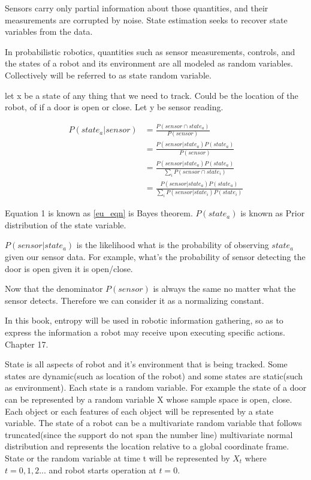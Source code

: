 \documentclass{article}
\begin{document}
Sensors carry only partial information about those quantities, and their measurements are corrupted by noise. State estimation seeks to recover state variables from the data.

In probabilistic robotics, quantities such as
sensor measurements, controls, and the states of a robot and its environment are all modeled as random variables. Collectively will be referred to as state random variable.

let x be a state of any thing that we need to track. Could be the location of the robot, of if a door is open or close. Let y be sensor reading.

\begin{align}  \label{eu_eqn}
P(state_a | sensor) 
&= \frac{P(sensor \cap state_a)}{P(sensor)} \\
&= \frac{P(sensor | state_a)P(state_a)}{P(sensor)} \\
&= \frac{P(sensor | state_a)P(state_a)}{\sum_iP(sensor \cap state_i)} \\
&= \frac{P(sensor | state_a)P(state_a)}{\sum_iP(sensor | state_i)P(state_i)} 
\end{align}

Equation 1 is known as \ref{eu_eqn} is Bayes theorem.
$P(state_a)$ is known as Prior distribution of the state variable.

$P(sensor | state_a)$ is the likelihood what is the probability of observing $state_a$ given our sensor data. For example, what's the probability of sensor detecting the door is open given it is open/close.

Now that the denominator $P(sensor)$ is always the same no matter what the sensor detects. Therefore we can consider it as a normalizing constant.

In this book, entropy will be used in robotic information gathering, so as to express the information a robot may receive upon executing specific actions. Chapter 17.

State is all aspects of robot and it's environment that is being tracked. Some states are dynamic(such as location of the robot) and some states are static(such as environment). Each state is a random variable. For example the state of a door can be represented by a random variable X whose sample space is {open, close}. Each object or each features of each object will be represented by a state variable. The state of a robot can be a multivariate random variable that follows truncated(since the support do not span the number line) multivariate normal distribution and represents the location relative to a global coordinate frame. State or the random variable at time t will be represented by $X_t$ where $t = 0, 1, 2 ...$ and robot starts operation at $t = 0$.
\end{document}
